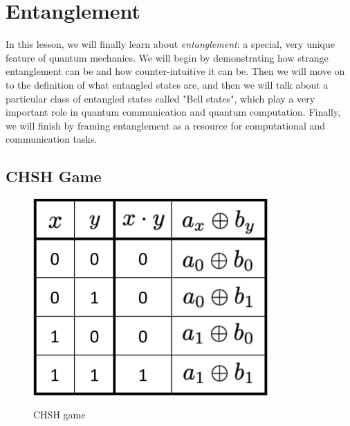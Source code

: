 \chapter{Entanglement}


In this lesson, we will finally learn about \emph{entanglement}: a special, very unique feature of quantum mechanics. We will begin by demonstrating how strange entanglement can be and how counter-intuitive it can be. Then we will move on to the definition of what entangled states are, and then we will talk about a particular class of entangled states called "Bell states", which play a very important role in quantum communication and quantum computation. Finally, we will finish by framing entanglement as a resource for computational and communication tasks.


\section{CHSH Game}


\begin{figure}[H]
    \centering
    \includegraphics[width=0.8\textwidth]{lesson4/CHSH_table.pdf}
    \label{fig: 1}
    \begin{center}
        \caption{CHSH game}
    \end{center}
\end{figure}
\fi




